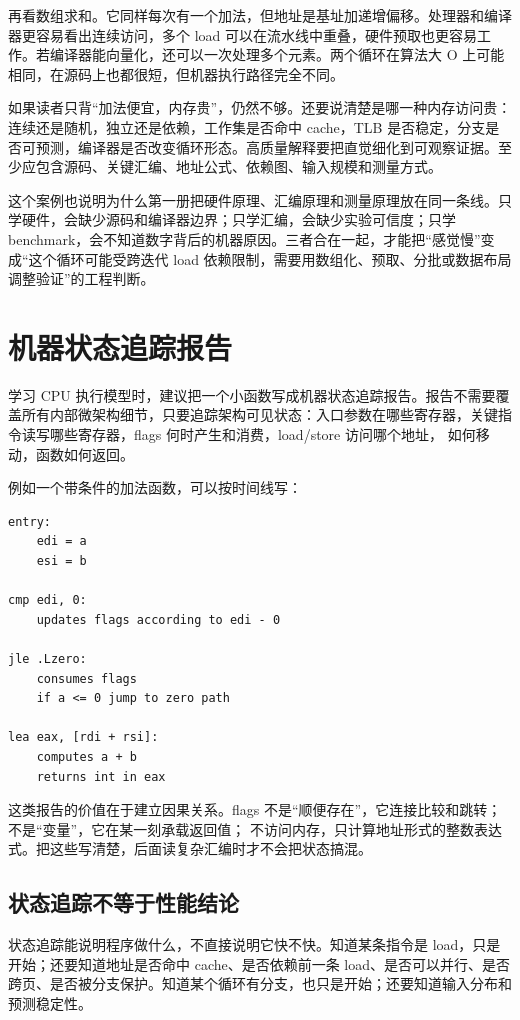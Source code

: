 再看数组求和。它同样每次有一个加法，但地址是基址加递增偏移。处理器和编译器更容易看出连续访问，多个 load 可以在流水线中重叠，硬件预取也更容易工作。若编译器能向量化，还可以一次处理多个元素。两个循环在算法大 O 上可能相同，在源码上也都很短，但机器执行路径完全不同。

如果读者只背“加法便宜，内存贵”，仍然不够。还要说清楚是哪一种内存访问贵：连续还是随机，独立还是依赖，工作集是否命中 cache，TLB 是否稳定，分支是否可预测，编译器是否改变循环形态。高质量解释要把直觉细化到可观察证据。至少应包含源码、关键汇编、地址公式、依赖图、输入规模和测量方式。

这个案例也说明为什么第一册把硬件原理、汇编原理和测量原理放在同一条线。只学硬件，会缺少源码和编译器边界；只学汇编，会缺少实验可信度；只学 benchmark，会不知道数字背后的机器原因。三者合在一起，才能把“感觉慢”变成“这个循环可能受跨迭代 load 依赖限制，需要用数组化、预取、分批或数据布局调整验证”的工程判断。

\section{机器状态追踪报告}

学习 CPU 执行模型时，建议把一个小函数写成机器状态追踪报告。报告不需要覆盖所有内部微架构细节，只要追踪架构可见状态：入口参数在哪些寄存器，关键指令读写哪些寄存器，flags 何时产生和消费，load/store 访问哪个地址， 如何移动，函数如何返回。

例如一个带条件的加法函数，可以按时间线写：

\begin{lstlisting}
entry:
    edi = a
    esi = b

cmp edi, 0:
    updates flags according to edi - 0

jle .Lzero:
    consumes flags
    if a <= 0 jump to zero path

lea eax, [rdi + rsi]:
    computes a + b
    returns int in eax
\end{lstlisting}

这类报告的价值在于建立因果关系。flags 不是“顺便存在”，它连接比较和跳转； 不是“变量”，它在某一刻承载返回值； 不访问内存，只计算地址形式的整数表达式。把这些写清楚，后面读复杂汇编时才不会把状态搞混。

\subsection{状态追踪不等于性能结论}

状态追踪能说明程序做什么，不直接说明它快不快。知道某条指令是 load，只是开始；还要知道地址是否命中 cache、是否依赖前一条 load、是否可以并行、是否跨页、是否被分支保护。知道某个循环有分支，也只是开始；还要知道输入分布和预测稳定性。

